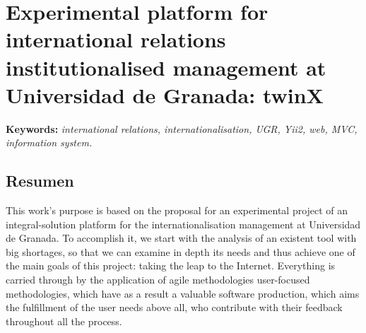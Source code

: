 \chapter*{Experimental platform for international relations institutionalised management at Universidad de Granada: twinX}


\textbf{Keywords:} \textit{international relations, internationalisation, UGR, Yii2, web, MVC, information system.}

\section*{Resumen}

\noindent This work's purpose is based on the proposal for an experimental project of an integral-solution platform for the internationalisation management at Universidad de Granada. To accomplish it, we start with the analysis of an existent tool with big shortages, so that we can examine in depth its needs and thus achieve one of the main goals of this project: taking the leap to the Internet. Everything is carried through by the application of agile methodologies user-focused methodologies, which have as a result a valuable software production, which aims the fulfillment of the user needs above all, who contribute with their feedback throughout all the process.